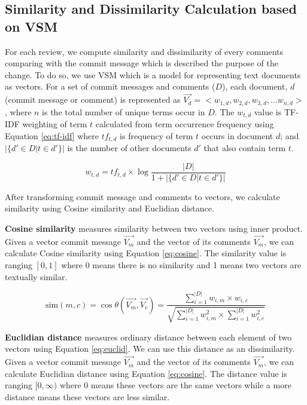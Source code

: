\documentclass[conference]{IEEEtran}
\begin{document}
\subsection{Similarity and Dissimilarity Calculation based on VSM}
For each review, we compute similarity and dissimilarity of every comments comparing with the commit message which is described the purpose of the change.
To do so, we use VSM which is a model for representing text documents as vectors. For a set of commit messages and comments ($D$), each document, $d$ (commit message or comment) is represented as $\overrightarrow{V_d} = <w_{1,d},w_{2,d},w_{3,d},...w_{n,d}>$, where $n$ is the total number of unique terms occur in $D$. The $w_{t,d}$ value is TF-IDF weighting of term $t$ calculated from term occurrence frequency using Equation \ref{eq:tf-idf} where $tf_{t,d}$ is frequency of term $t$ occurs in document $d$; and $|\{d' \in D | t \in d'\}|$ is the number of other documents $d'$ that also contain term $t$.  

\begin{equation}
w_{t,d} = tf_{t,d} \times \log\frac{|D|}{1+|\{d' \in D | t \in d'\}|}
\label{eq:tf-idf}
\end{equation}

After transforming commit message and comments to vectors, we calculate similarity using Cosine similarity and Euclidian distance. 

\noindent\textbf{Cosine similarity} measures similarity between two vectors using inner product. Given a vector commit message $\overrightarrow{V_m}$ and the vector of its comments $\overrightarrow{V_m}$, we can calculate Cosine similarity using Equation \ref{eq:cosine}. The similarity value is ranging $[0,1]$ where 0 means there is no similarity and 1 means two vectors are textually similar.  

\begin{equation}
\mathrm{sim}(m,c) = \cos\theta(\overrightarrow{V_m},\overrightarrow{V_c}) = \frac{\sum_{i=1}^{|D|} w_{i,m} \times w_{i,c}}{\sqrt{\sum_{i=1}^{|D|} w^2_{i,m} \times \sum_{i=1}^{|D|} w^2_{i,c}}}
\label{eq:cosine}
\end{equation}

\noindent\textbf{Euclidian distance} measures ordinary distance between each element of two vectors using Equation \ref{eq:euclid}. We can use this distance as an dissimilarity. Given a vector commit message $\overrightarrow{V_m}$ and the vector of its comments $\overrightarrow{V_m}$, we can calculate Euclidian distance using Equation \ref{eq:cosine}. The distance value is ranging $[0,\infty)$ where 0 means these vectors are the same vectors while a more distance means these vectors are less similar.
\end{document}
